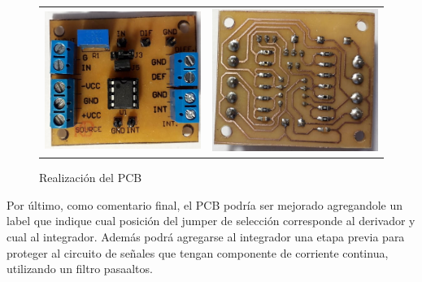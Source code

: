 \begin{figure}[H]
	\centering
	\begin{tabular}{c c}
		\includegraphics[scale=0.55]{Recursos/Altium/OVERLAY_Hecho.png} &
		\includegraphics[scale=0.55]{Recursos/Altium/PCB_Hecho.png}
	\end{tabular}
	\caption{Realizaci\'on del PCB}
	\label{fig:hecho}
\end{figure}

Por \'ultimo, como comentario final, el PCB podr\'ia ser mejorado agregandole un label que indique cual posici\'on del jumper de selecci\'on
corresponde al derivador y cual al integrador. Adem\'as podr\'a agregarse al integrador una etapa previa para proteger al circuito de se\~nales que tengan
componente de corriente continua, utilizando un filtro pasaaltos.

